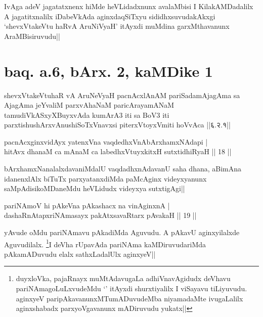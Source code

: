 \begin{artha}
IvAga adeV jagatatxnenx hiMde heVLidadxnunx avalaMbisi I 
KilakAMDadalilx A jagatitxnalilx iDabeVkAda aginxdaqSiTxyu 
sididhxsuvudakAkxgi `shevxVtakeVtu haRvA AruNiVyaH' itAyxdi muMdina 
garxMthavanunx AraMBisiruvudu||
\end{artha}

\section*{baq. a.6, bArx. 2, kaMDike 1}

\begin{shl}
shevxVtakeVtuhaR vA AruNeVyaH pacnAcxlAnAM pariSadamAjagAma sa AjagAma jeYvaliM parxvAhaNaM paricArayamANaM tamudiVkASxyXBuyxvAda kumArA3 iti sa BoV3 iti parxtishushArxvAnushiSoTxV\s navxsi piterxVtoyxVmiti hoVvAca ||६.२.१||
\end{shl}


\begin{shl}
pacnAcxginxvidAyx yatenxVna vaqdedhxVnAbArxhamxNAdapi | \\
hitAvx dhanaM ca mAnaM ca labedhxVtuyxkitxH sutxtidhiRyaH \hfill|| 18 || 
\end{shl}

\begin{artha}
bArxhamxNanalalxdavaniMdalU vaqdadhxnAdavanU saha dhana, aBimAna 
idanenxlAlx biTuTx parxyatanxdiMda paMcAginx videyxyanunx 
saMpAdisikoMDaneMdu heVLidudx videyxya sutxtigAgi||
\end{artha}


\begin{shl}
pariNAmoV hi pAkeVna pAkashacx na vinA\s ginxnA | \\
dashaRnAtapxriNAmasayx pakAtxsavaRtarx pAvakaH \hfill|| 19 || 
\end{shl}

\begin{artha}
yAvude oMdu pariNAmavu pAkadiMda Aguvudu. A pAkavU aginxyilalxde 
Aguvudilalx. \footnote[1]{duyxloVka, pajaRnayx muMtAdavugaLa 
adhiVnavAgidudx deVhavu pariNAmagoLuLxvudeMdu `\stext' itAyxdi 
shurxtiyalilx I viSayavu tiLiyuvudu. aginxyeV 
paripAkavanunxMTumADuvudeMba niyamadaMte ivugaLalilx aginxshabadx 
parxyoVgavanunx mADiruvudu yukatx||}I deVha rUpavAda pariNAma kaMDiruvudariMda 
pAkamADuvudu elalx sathxLadalUlx aginxyeV||
\end{artha}


